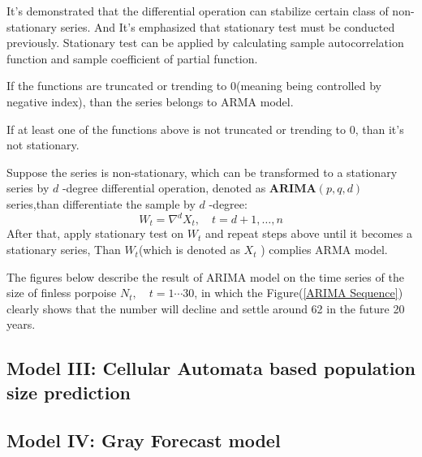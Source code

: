 \documentclass{mcmthesis}
\numberwithin{figure}{section}
\numberwithin{table}{section}
\numberwithin{equation}{section}
\begin{document}
\par
It's demonstrated that the differential operation can stabilize 
certain class of non-stationary series. And It's emphasized that 
stationary test must be conducted previously. Stationary test can 
be applied by calculating sample autocorrelation function and 
sample coefficient of partial function. 
\par
If the functions are truncated or trending to 0(meaning being controlled
by negative index), than the series belongs to ARMA model.
\par
If at least one of the functions above is not truncated or trending to 0, than
it's not stationary.
\par
Suppose the series is non-stationary, which can be transformed to 
a stationary series by $ d $ -degree differential operation, denoted
as $ \mathbf{ARIMA}(p,q,d) $ series,than differentiate the sample by
$ d $ -degree:
$$
  W_t = \nabla^dX_t,\quad t = d+1,\dots , n
$$ 
After that, apply stationary test on $ W_t $ and repeat steps above 
until it becomes a stationary series, Than $ W_t $(which is denoted
as $ X_t $ ) complies ARMA model. 
\par
The figures below describe the result of ARIMA model on the 
time series of the size of finless porpoise $ N_t, \quad t = 1\cdots 30 $,
in which the Figure(\ref{ARIMA Sequence}) clearly shows that the number
will decline and settle around 62 in the future 20 years. 

\subsection{Model III: Cellular Automata based population size prediction}

\subsection{Model IV: Gray Forecast model}
\end{document}

